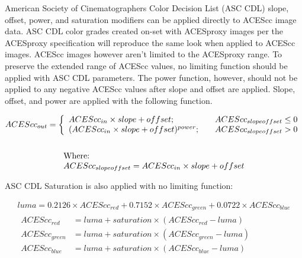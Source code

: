 \label{appendixB}

American Society of Cinematographers Color Decision List (ASC CDL) slope, offset, power, and saturation modifiers can be applied directly to ACEScc image data. ASC CDL color grades created on-set with ACESproxy images per the ACESproxy specification will reproduce the same look when applied to ACEScc images. ACEScc images however aren’t limited to the ACESproxy range. To preserve the extended range of ACEScc values, no limiting function should be applied with ASC CDL parameters. The power function, however, should not be applied to any negative ACEScc values after slope and offset are applied. Slope, offset, and power are applied with the following function.

\begin{gather*} 
    ACEScc_{out} = \left\{ 
    \begin{array}{l r }
        ACEScc_{in} \times slope + offset; & \quad ACEScc_{slopeoffset} \leq 0 \\
        (ACEScc_{in} \times slope + offset)^{power}; & \quad ACEScc_{slopeoffset} > 0 \\
    \end{array} \right. \\ 
    \\
    \begin{array}{l}
    \text{Where:}\\
    ACEScc_{slopeoffset} = ACEScc_{in} \times slope + offset
    \end{array}
\end{gather*}

ASC CDL Saturation is also applied with no limiting function:

\begin{gather*}
    luma = 0.2126 \times ACEScc_{red} + 0.7152 \times ACEScc_{green} + 0.0722 \times ACEScc_{blue} \\
    \begin{aligned}
        ACEScc_{red} &= luma + saturation \times (ACEScc_{red} - luma) \\
        ACEScc_{green} &= luma + saturation \times (ACEScc_{green} - luma) \\        
        ACEScc_{blue} &= luma + saturation \times (ACEScc_{blue} - luma) \\ 
    \end{aligned}
\end{gather*}
    